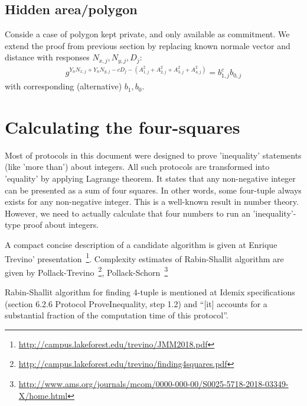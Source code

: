 \documentclass[a4paper,12pt]{article}
\begin{document}
\subsection{Hidden area/polygon}

Conside a case of polygon kept private, and only available as commitment.
We extend the proof from previous section
by replacing known normale vector and distance with responses $N_{x,j}, N_{y,j}, D_j$:
\begin{gather}
  g^{Y_n N_{x,j} + Y_n N_{y,j} - c D_j - (A_{1,j}^2 + A_{2,j}^2 + A_{3,j}^2 + A_{4,j}^2)} = b_{1,j}^c b_{0,j}
\end{gather}
with corresponding (alternative) $b_1, b_0$.

\section{Calculating the four-squares} %

Most of protocols in this document were designed to prove 'inequality' statements (like 'more than') about integers.
All such protocols are transformed into 'equality' by applying Lagrange theorem.
It states that any non-negative integer can be presented as a sum of four squares.
In other words, some four-tuple always exists for any non-negative integer.
This is a well-known result in number theory.
However, we need to actually calculate that four numbers to run an 'inequality'-type proof about integers.

A compact concise description of a candidate algorithm is given at Enrique Trevino' presentation~\footnote{\url{http://campus.lakeforest.edu/trevino/JMM2018.pdf}}.
Complexity estimates of Rabin-Shallit algorithm are given by Pollack-Trevino~\footnote{\url{http://campus.lakeforest.edu/trevino/finding4squares.pdf}},
Pollack-Schorn~\footnote{\url{http://www.ams.org/journals/mcom/0000-000-00/S0025-5718-2018-03349-X/home.html}}
%

Rabin-Shallit algorithm for finding 4-tuple is mentioned at Idemix specifications %
(section 6.2.6 Protocol ProveInequality, step 1.2)
and ``[it] accounts for a substantial fraction of the computation time of this protocol''.
\end{document}
